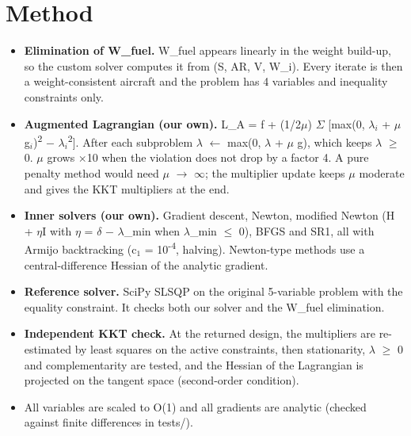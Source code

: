 \documentclass[10pt,a4paper]{article}
\begin{document}
\section{Method}
\begin{itemize}\setlength{\itemsep}{1pt}
\item \textbf{Elimination of W\_fuel.} W\_fuel appears linearly in the weight build-up, so the custom solver computes it from (S, AR, V, W\_i). Every iterate is then a weight-consistent aircraft and the problem has 4 variables and inequality constraints only.
\item \textbf{Augmented Lagrangian (our own).} L\_A = f + (1/2$\mu$) $\Sigma$ [max(0, $\lambda$$_i$ + $\mu$ g$_i$)\textsuperscript{2} $-$ $\lambda$$_i$\textsuperscript{2}]. After each subproblem $\lambda$ $\leftarrow$ max(0, $\lambda$ + $\mu$ g), which keeps $\lambda$ $\ge$ 0. $\mu$ grows $\times$10 when the violation does not drop by a factor 4. A pure penalty method would need $\mu$ $\rightarrow$ $\infty$; the multiplier update keeps $\mu$ moderate and gives the KKT multipliers at the end.
\item \textbf{Inner solvers (our own).} Gradient descent, Newton, modified Newton (H + $\eta$I with $\eta$ = $\delta$ $-$ $\lambda$\_min when $\lambda$\_min $\le$ 0), BFGS and SR1, all with Armijo backtracking (c$_1$ = 10\textsuperscript{-}\textsuperscript{4}, halving). Newton-type methods use a central-difference Hessian of the analytic gradient.
\item \textbf{Reference solver.} SciPy SLSQP on the original 5-variable problem with the equality constraint. It checks both our solver and the W\_fuel elimination.
\item \textbf{Independent KKT check.} At the returned design, the multipliers are re-estimated by least squares on the active constraints, then stationarity, $\lambda$ $\ge$ 0 and complementarity are tested, and the Hessian of the Lagrangian is projected on the tangent space (second-order condition).
\item All variables are scaled to O(1) and all gradients are analytic (checked against finite differences in tests/).
\end{itemize}
\end{document}
